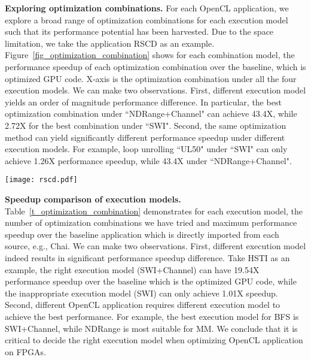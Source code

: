 {\bf Exploring optimization combinations. }For each OpenCL application, we explore a broad range of optimization combinations for each execution model such that its performance potential has been harvested. Due to the space limitation, we take the application RSCD as an example. 
Figure~\ref{fig_optimization_combination} shows for each combination model, the performance speedup of each optimization combination over the baseline, which is optimized GPU code. X-axis is the optimization combination under all the four execution models. We can make two observations. 
First, different execution model yields an order of magnitude performance difference. In particular, the best optimization combination under ``NDRange+Channel" can achieve 43.4X, while 2.72X for the best combination under ``SWI". 
Second, the same optimization method can yield significantly different performance speedup under different execution models. For example, loop unrolling ``UL50" under ``SWI" can only achieve 1.26X performance speedup, while 43.4X under ``NDRange+Channel".  

 

\begin{figure*}[t]
	\centering
	\texttt{[image: rscd.pdf]}
	\vspace{-3.5ex}
	\caption{Performance speedup of optimization combinations over baseline.}%
	\vspace{-1ex}
	\label{fig_optimization_combination}
\end{figure*} 



{\bf Speedup comparison of execution models. }
Table~\ref{t_optimization_combination} demonstrates for each execution model, the number of optimization combinations we have tried and maximum performance speedup over the baseline application which is directly imported from each source, e.g., Chai. 
We can make two observations. First, different execution model indeed results in significant performance speedup difference. Take HSTI as an example, the right execution model (SWI+Channel) can have 19.54X performance speedup over the baseline which is the optimized GPU code, while the inappropriate execution model (SWI) can only achieve 1.01X speedup. Second, different OpenCL application requires different execution model to achieve the best performance. For example, the best execution model for BFS is SWI+Channel, while NDRange is most suitable for MM. We conclude that it is critical to decide the right execution model when optimizing OpenCL application on FPGAs.  


